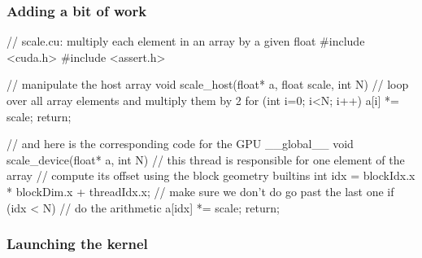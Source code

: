 \begin{frame}[fragile]
%
  \frametitle{Adding a bit of work}
  \label{slide:hello-world-cuda}
%
  \begin{C}
// scale.cu: multiply each element in an array by a given float
#include <cuda.h>
#include <assert.h>

// manipulate the host array
void scale_host(float* a, float scale, int N) {
    // loop over all array elements and multiply them by 2 
    for (int i=0; i<N; i++) {
        a[i] *= scale;
    }
    return;
}

// and here is the corresponding code for the GPU
__global__ void scale_device(float* a, int N) {
    // this thread is responsible for one element of the array
    // compute its offset using the block geometry builtins
    int idx = blockIdx.x * blockDim.x  + threadIdx.x;
    // make sure we don't do go past the last one
    if (idx < N) {
        // do the arithmetic
        a[idx] *= scale;
    }
    return;
}
  \end{C}
%
\end{frame}

\begin{frame}[fragile]
%
  \frametitle{Launching the kernel}
  \label{slide:launching-kernel-cuda}
%
%
\end{frame}


